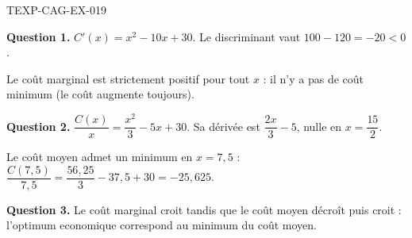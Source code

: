 \begin{corrige}{TEXP-CAG-EX-019}

\textbf{Question 1.} $C'(x) = x^2 - 10x + 30$. Le discriminant vaut $100 - 120 = -20 < 0$.


Le coût marginal est strictement positif pour tout $x$ : il n'y a pas de coût minimum (le coût augmente toujours).

\textbf{Question 2.} $\dfrac{C(x)}{x} = \dfrac{x^2}{3} - 5x + 30$. Sa dérivée est $\dfrac{2x}{3} - 5$, nulle en $x = \dfrac{15}{2}$.

Le coût moyen admet un minimum en $x = 7{,}5$ : $\dfrac{C(7{,}5)}{7{,}5} = \dfrac{56{,}25}{3} - 37{,}5 + 30 = -25{,}625$.

\textbf{Question 3.} Le coût marginal croit tandis que le coût moyen décroît puis croit : l'optimum economique correspond au minimum du coût moyen.

\end{corrige}
